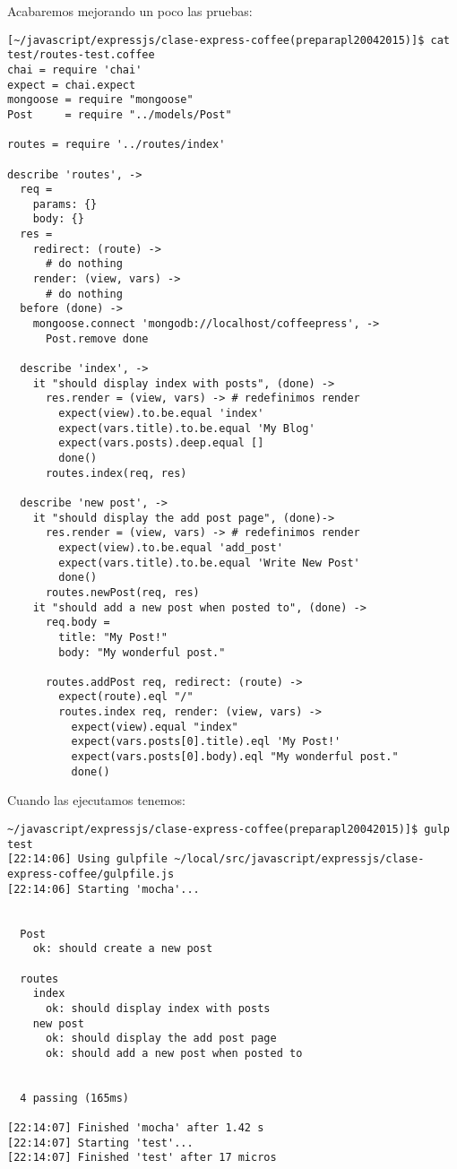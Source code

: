 Acabaremos mejorando un poco las pruebas:
\begin{verbatim}
[~/javascript/expressjs/clase-express-coffee(preparapl20042015)]$ cat test/routes-test.coffee 
chai = require 'chai'
expect = chai.expect
mongoose = require "mongoose"
Post     = require "../models/Post"

routes = require '../routes/index'

describe 'routes', ->
  req = 
    params: {}
    body: {}
  res = 
    redirect: (route) ->
      # do nothing
    render: (view, vars) -> 
      # do nothing
  before (done) ->
    mongoose.connect 'mongodb://localhost/coffeepress', ->
      Post.remove done

  describe 'index', ->
    it "should display index with posts", (done) ->
      res.render = (view, vars) -> # redefinimos render
        expect(view).to.be.equal 'index'
        expect(vars.title).to.be.equal 'My Blog'
        expect(vars.posts).deep.equal []
        done()
      routes.index(req, res)

  describe 'new post', ->
    it "should display the add post page", (done)->
      res.render = (view, vars) -> # redefinimos render
        expect(view).to.be.equal 'add_post'
        expect(vars.title).to.be.equal 'Write New Post'
        done()
      routes.newPost(req, res)
    it "should add a new post when posted to", (done) ->
      req.body = 
        title: "My Post!"
        body: "My wonderful post."

      routes.addPost req, redirect: (route) ->
        expect(route).eql "/"
        routes.index req, render: (view, vars) ->
          expect(view).equal "index"
          expect(vars.posts[0].title).eql 'My Post!'
          expect(vars.posts[0].body).eql "My wonderful post."
          done()
\end{verbatim}
Cuando las ejecutamos tenemos:
\begin{verbatim}
~/javascript/expressjs/clase-express-coffee(preparapl20042015)]$ gulp test
[22:14:06] Using gulpfile ~/local/src/javascript/expressjs/clase-express-coffee/gulpfile.js
[22:14:06] Starting 'mocha'...


  Post
    ok: should create a new post

  routes
    index
      ok: should display index with posts
    new post
      ok: should display the add post page
      ok: should add a new post when posted to


  4 passing (165ms)

[22:14:07] Finished 'mocha' after 1.42 s
[22:14:07] Starting 'test'...
[22:14:07] Finished 'test' after 17 micros
\end{verbatim}

